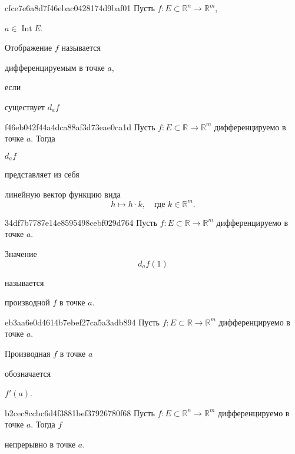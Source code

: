 \begin{note}{cfce7e6a8d7f46ebac0428174d9baf01}
    Пусть \({ f : E  \subset \mathbb R^{n} \to \mathbb R^{m} }\), \begin{icloze}{3}\({ a \in \operatorname{Int} E }\).\end{icloze}
    Отображение \({ f }\) называется \begin{icloze}{2}дифференцируемым в точке \({ a }\),\end{icloze} если \begin{icloze}{1}существует \({ d_a f }\)\end{icloze}
\end{note}

\begin{note}{f46eb042f44a4dca88af3d73eae0ca1d}
    Пусть \({ f : E \subset \mathbb R \to \mathbb R^{m} }\) дифференцируемо в точке \({ a }\).
    Тогда \begin{icloze}{2}\({ d_{a} f }\)\end{icloze} представляет из себя
    \begin{icloze}{1}линейную вектор функцию вида
        \[
            h \mapsto h \cdot k, \quad \text{где \({ k \in \mathbb R^{m} }\)}.
        \]
    \end{icloze}
\end{note}

\begin{note}{34df7b7787e14e8595498cebf029d764}
    Пусть \({ f : E \subset \mathbb R \to \mathbb R^{m} }\) дифференцируемо в точке \({ a }\).
    \begin{icloze}{2}
        Значение
        \[
            d_{a}f(1)
        \]
    \end{icloze}
    называется \begin{icloze}{1}производной \({ f }\) в точке \({ a }\).\end{icloze}
\end{note}

\begin{note}{eb3aa6e0d4614b7ebef27ca5a3adb894}
    Пусть \({ f : E \subset \mathbb R \to \mathbb R^{m} }\) дифференцируемо в точке \({ a }\).
    \begin{icloze}{2}Производная \({ f }\) в точке \({ a }\)\end{icloze} обозначается \begin{icloze}{1}\({ f'(a) }\).\end{icloze}
\end{note}

\begin{note}{b2cec8ccbc6d4f3881bef37926780f68}
    Пусть \({ f : E \subset \mathbb R^{n} \to \mathbb R^{m} }\) дифференцируемо в точке \({ a }\).
    Тогда \({ f }\) \begin{icloze}{1}непрерывно в точке \({ a }\).\end{icloze}
\end{note}

